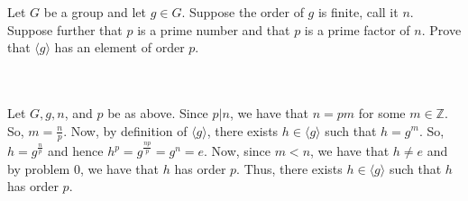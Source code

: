 Let $G$ be a group and let $g\in G$. Suppose the order of $g$ is finite, call it $n$. Suppose further
that $p$ is a prime number and that $p$ is a prime factor of $n$. Prove that $\langle g\rangle$ has an
element of order $p$.\\\\

\begin{solution}\renewcommand{\qedsymbol}{}\ \\
    Let $G, g, n$, and $p$ be as above. Since $p|n$, we have that $n=pm$ for some $m\in\mathbb{Z}$. So,
    $m=\frac{n}{p}$. Now, by definition of $\langle g\rangle$, there exists $h\in\langle g\rangle$ such
    that $h=g^m$. So, $h=g^{\frac{n}{p}}$ and hence $h^p=g^{\frac{np}{p}}=g^n=e$. Now, since $m<n$, we
    have that $h\neq e$ and by problem 0, we have that $h$ has order $p$. Thus, there exists
    $h\in\langle g\rangle$ such that $h$ has order $p$.

\end{solution}